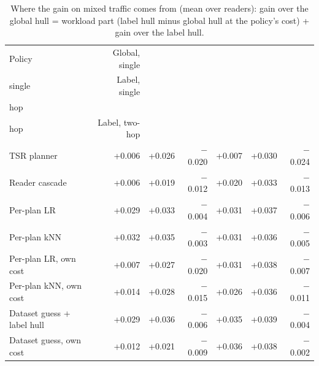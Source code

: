\begin{table}[t]
\centering\small
\setlength{\tabcolsep}{4pt}
\caption{Where the gain on mixed traffic comes from (mean over readers): gain over the global hull = workload part (label hull minus global hull at the policy's cost) + gain over the label hull.}
\label{tab:extra_decomp}
\begin{tabular*}{\linewidth}{@{\extracolsep{\fill}}lrrrrrr}
\toprule
Policy & Global, single & \begin{tabular}[b]{@{}r@{}}Workload, \\ single\end{tabular} & Label, single & \begin{tabular}[b]{@{}r@{}}Global, two \\ hop\end{tabular} & \begin{tabular}[b]{@{}r@{}}Workload, two \\ hop\end{tabular} & Label, two-hop \\
\midrule
TSR planner & +0.006 & +0.026 & $-$0.020 & +0.007 & +0.030 & $-$0.024 \\
Reader cascade & +0.006 & +0.019 & $-$0.012 & +0.020 & +0.033 & $-$0.013 \\
Per-plan LR & +0.029 & +0.033 & $-$0.004 & +0.031 & +0.037 & $-$0.006 \\
Per-plan kNN & +0.032 & +0.035 & $-$0.003 & +0.031 & +0.036 & $-$0.005 \\
Per-plan LR, own cost & +0.007 & +0.027 & $-$0.020 & +0.031 & +0.038 & $-$0.007 \\
Per-plan kNN, own cost & +0.014 & +0.028 & $-$0.015 & +0.026 & +0.036 & $-$0.011 \\
Dataset guess + label hull & +0.029 & +0.036 & $-$0.006 & +0.035 & +0.039 & $-$0.004 \\
Dataset guess, own cost & +0.012 & +0.021 & $-$0.009 & +0.036 & +0.038 & $-$0.002 \\
\bottomrule
\end{tabular*}
\end{table}
